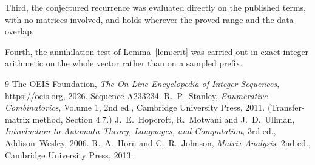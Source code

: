 \documentclass[11pt,a4paper]{article}
\theoremstyle{plain}
\theoremstyle{definition}
\begin{document}
Third, the conjectured recurrence was evaluated directly on the published terms, with no
matrices involved, and holds wherever the proved range and the data overlap.

Fourth, the annihilation test of Lemma~\ref{lem:crit} was carried out in exact integer
arithmetic on the whole vector rather than on a sampled prefix.

\begin{thebibliography}{9}
 The OEIS Foundation, \emph{The On-Line Encyclopedia of Integer
Sequences}, \url{https://oeis.org}, 2026. Sequence A233234.
 R.~P.~Stanley, \emph{Enumerative Combinatorics}, Volume 1, 2nd ed.,
Cambridge University Press, 2011. (Transfer-matrix method, Section 4.7.)
 J.~E.~Hopcroft, R.~Motwani and J.~D.~Ullman, \emph{Introduction to Automata
Theory, Languages, and Computation}, 3rd ed., Addison--Wesley, 2006.
 R.~A.~Horn and C.~R.~Johnson, \emph{Matrix Analysis}, 2nd ed., Cambridge
University Press, 2013.
\end{thebibliography}
\end{document}
